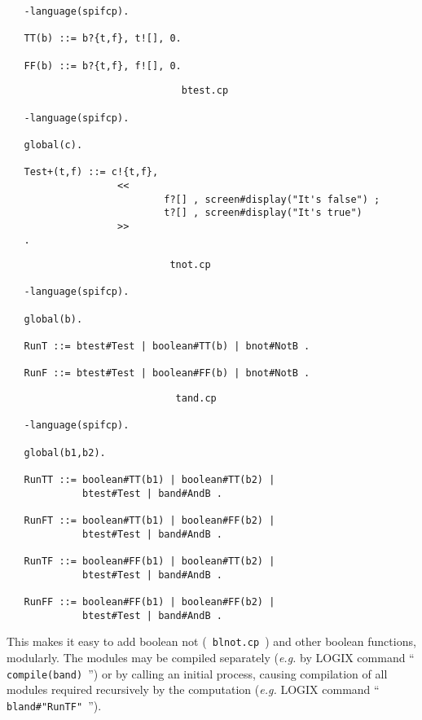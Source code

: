 \begin{verbatim}
   -language(spifcp).

   TT(b) ::= b?{t,f}, t![], 0.

   FF(b) ::= b?{t,f}, f![], 0.
\end{verbatim}

{\samepage
\begin{verbatim}
                              btest.cp

   -language(spifcp).

   global(c).

   Test+(t,f) ::= c!{t,f},
                   <<
                           f?[] , screen#display("It's false") ;
                           t?[] , screen#display("It's true")
                   >>
   .
\end{verbatim}
}

{\samepage
\begin{verbatim}
                            tnot.cp

   -language(spifcp).

   global(b).

   RunT ::= btest#Test | boolean#TT(b) | bnot#NotB .

   RunF ::= btest#Test | boolean#FF(b) | bnot#NotB .
\end{verbatim}
}

\begin{verbatim}
                             tand.cp

   -language(spifcp).

   global(b1,b2).

   RunTT ::= boolean#TT(b1) | boolean#TT(b2) |
             btest#Test | band#AndB .

   RunFT ::= boolean#TT(b1) | boolean#FF(b2) |
             btest#Test | band#AndB .

   RunTF ::= boolean#FF(b1) | boolean#TT(b2) |
             btest#Test | band#AndB .

   RunFF ::= boolean#FF(b1) | boolean#FF(b2) |
             btest#Test | band#AndB .
\end{verbatim}

\noindent
This makes it easy to add boolean not (\verb+ blnot.cp +) and other
boolean functions, modularly.  The modules may be compiled separately
({\em e.g.} by LOGIX command ``\verb+ compile(band) +'') or by calling
an initial process, causing compilation of all modules required
recursively by the computation 
({\em e.g.} LOGIX command ``\verb+ bland#"RunTF" +'').

